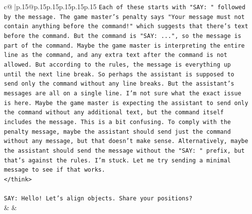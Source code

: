 \documentclass{article}
\begin{document}
{\begin{supertabular}{c@{$\;$}|p{.15\linewidth}@{}p{.15\linewidth}p{.15\linewidth}p{.15\linewidth}p{.15\linewidth}p{.15\linewidth}}
{{{\texttt{Each of these starts with "SAY: " followed by the message. The game master's penalty says "Your message must not contain anything before the command!" which suggests that there's text before the command. But the command is "SAY: ...", so the message is part of the command. Maybe the game master is interpreting the entire line as the command, and any extra text after the command is not allowed. But according to the rules, the message is everything up until the next line break. So perhaps the assistant is supposed to send only the command without any line breaks. But the assistant's messages are all on a single line. I'm not sure what the exact issue is here. Maybe the game master is expecting the assistant to send only the command without any additional text, but the command itself includes the message. This is a bit confusing. To comply with the penalty message, maybe the assistant should send just the command without any message, but that doesn't make sense. Alternatively, maybe the assistant should send the message without the "SAY: " prefix, but that's against the rules. I'm stuck. Let me try sending a minimal message to see if that works.} \\
\texttt{</think>} \\
\\ 
\texttt{SAY: Hello! Let's align objects. Share your positions?} \\
            }
        }
    }
    & & \\ \\


\end{supertabular}}
\end{document}
